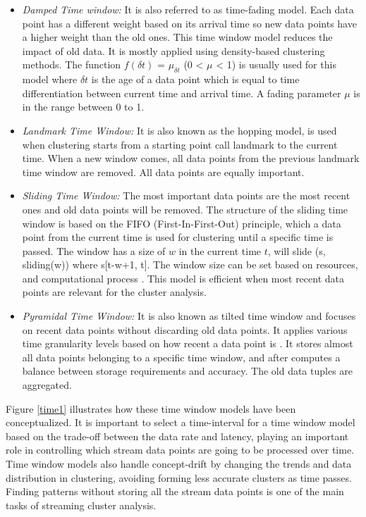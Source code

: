 \begin{itemize}

    \item\textit{Damped Time window:} It is also referred to as time-fading model. Each data point has a different weight based on its arrival time so new data points have a higher weight than the old ones. This time window model reduces the impact of old data. It is mostly applied using density-based clustering methods. The function $f(\delta t)$ = $\mu_{\delta t}$ (0 < $\mu$ < 1) is usually used for this model where $\delta t$ is the age of a data point which is equal to time differentiation between current time and arrival time. A fading parameter $\mu$ is in the range between 0 to 1. 
    
    
    \item\textit{Landmark Time Window:} It is also known as the hopping model, is used when clustering starts from a starting point call landmark to the current time. When a new window comes, all data points from the previous landmark time window are removed. All data points are equally important.

    \item\textit{Sliding Time Window: } The most important data points are the most recent ones and old data points will be removed. The structure of the sliding time window is based on the FIFO (First-In-First-Out) principle, which a data point from the current time is used for clustering until a specific time is passed. The window has a size of $w$ in the current time $t$, will slide (s, sliding(w)) where s[t-w+1, t].
    The window size can be set based on resources, and computational process \cite{silva2013data}. This model is efficient when most recent data points are relevant for the cluster analysis.  
    
    \item\textit{Pyramidal Time Window: } It is also known as tilted time window and focuses on recent data points without discarding old data points. It applies various time granularity levels based on how recent a data point is \cite{aggarwal2003framework, nguyen2015survey}. It stores almost all data points belonging to a specific time window, and after computes a balance between storage requirements and accuracy. The old data tuples are aggregated. %
    
\end{itemize}    

Figure   \ref{time1} illustrates how these time window models have been conceptualized. It is important to select a time-interval for a time window model based on the trade-off between the data rate and latency, playing an important role in controlling which stream data points are going to be processed over time. Time window models also handle concept-drift by changing the trends and data distribution in clustering, avoiding forming less accurate clusters as time passes. Finding patterns without storing all the stream data points is one of the main tasks of streaming cluster analysis.

